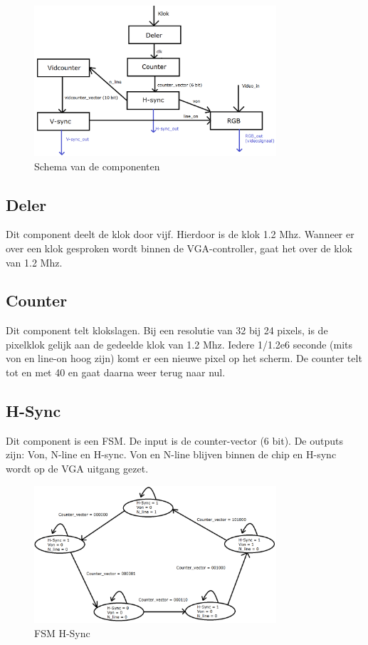 \documentclass[oneside,dutch]{tudelft-report}
\begin{document}
\begin{figure}[H]
\center
\includegraphics[width=9cm]{schema-zonder-SRAM}
\caption{Schema van de componenten}
\label{VGA}
\end{figure}

\subsection{Deler}
Dit component deelt de klok door vijf. Hierdoor is de klok 1.2 Mhz. Wanneer er over een klok gesproken wordt binnen de VGA-controller, gaat het over de klok van 1.2 Mhz.

\subsection{Counter}
Dit component telt klokslagen. Bij een resolutie van 32 bij 24 pixels, is de pixelklok gelijk aan de gedeelde klok van 1.2 Mhz. Iedere 1/1.2e6 seconde (mits von en line-on hoog zijn) komt er een nieuwe pixel op het scherm. De counter telt tot en met 40 en gaat daarna weer terug naar nul.

\subsection{H-Sync}
Dit component is een FSM. De input is de counter-vector (6 bit). De outputs zijn: Von, N-line en H-sync. Von en N-line blijven binnen de chip en H-sync wordt op de VGA uitgang gezet.

\begin{figure}[H]
\center
\includegraphics[width=9cm]{FSM-H-sync}
\caption{FSM H-Sync}
\label{VGA}
\end{figure}
\end{document}
